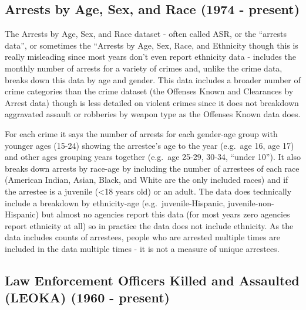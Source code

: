 \documentclass[
  12pt,
  openany]{book}
\begin{document}
\subsection{Arrests by Age, Sex, and Race (1974 - present)}\label{arrests-by-age-sex-and-race-1974---present}

The Arrests by Age, Sex, and Race dataset - often called ASR, or the ``arrests data'', or sometimes the ``Arrests by Age, Sex, Race, and Ethnicity though this is really misleading since most years don't even report ethnicity data - includes the monthly number of arrests for a variety of crimes and, unlike the crime data, breaks down this data by age and gender. This data includes a broader number of crime categories than the crime dataset (the Offenses Known and Clearances by Arrest data) though is less detailed on violent crimes since it does not breakdown aggravated assault or robberies by weapon type as the Offenses Known data does.

For each crime it says the number of arrests for each gender-age group with younger ages (15-24) showing the arrestee's age to the year (e.g.~age 16, age 17) and other ages grouping years together (e.g.~age 25-29, 30-34, ``under 10''). It also breaks down arrests by race-age by including the number of arrestees of each race (American Indian, Asian, Black, and White are the only included races) and if the arrestee is a juvenile (\textless18 years old) or an adult. The data does technically include a breakdown by ethnicity-age (e.g.~juvenile-Hispanic, juvenile-non-Hispanic) but almost no agencies report this data (for most years zero agencies report ethnicity at all) so in practice the data does not include ethnicity. As the data includes counts of arrestees, people who are arrested multiple times are included in the data multiple times - it is not a measure of unique arrestees.

\subsection{Law Enforcement Officers Killed and Assaulted (LEOKA) (1960 - present)}\label{law-enforcement-officers-killed-and-assaulted-leoka-1960---present}
\end{document}

